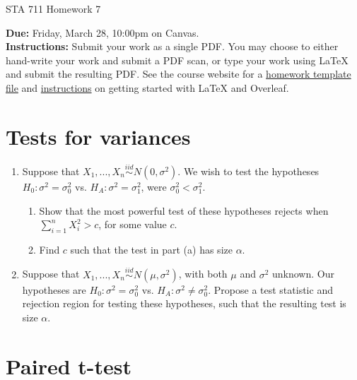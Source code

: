 \documentclass[11pt]{article}
\begin{document}
\begin{center}
\Large
STA 711 Homework 7\\
\normalsize
\vspace{5mm}
\end{center}

\noindent \textbf{Due:} Friday, March 28, 10:00pm on Canvas.\\ 

\noindent \textbf{Instructions:} Submit your work as a single PDF. You may choose to either hand-write your work and submit a PDF scan, or type your work using LaTeX and submit the resulting PDF. See the course website for a \href{https://sta711-s25.github.io/homework/hw_template.tex}{homework template file} and \href{https://sta711-s25.github.io/homework/latex_instructions/}{instructions} on getting started with LaTeX and Overleaf.

\section*{Tests for variances}


\begin{enumerate}

\item Suppose that $X_1,...,X_n \overset{iid}{\sim} N(0, \sigma^2)$. We wish to test the hypotheses $H_0: \sigma^2 = \sigma_0^2$ vs. $H_A: \sigma^2 = \sigma_1^2$, were $\sigma_0^2 < \sigma_1^2$.

\begin{enumerate}
\item Show that the most powerful test of these hypotheses rejects when $\sum \limits_{i=1}^n X_i^2 > c$, for some value $c$.
\item Find $c$ such that the test in part (a) has size $\alpha$.
\end{enumerate}

\item Suppose that $X_1,...,X_n \overset{iid}{\sim} N(\mu, \sigma^2)$, with both $\mu$ and $\sigma^2$ unknown. Our hypotheses are $H_0: \sigma^2 = \sigma_0^2$ vs. $H_A: \sigma^2 \neq \sigma_0^2$. Propose a test statistic and rejection region for testing these hypotheses, such that the resulting test is size $\alpha$.


\end{enumerate}

\section*{Paired t-test}
\end{document}
